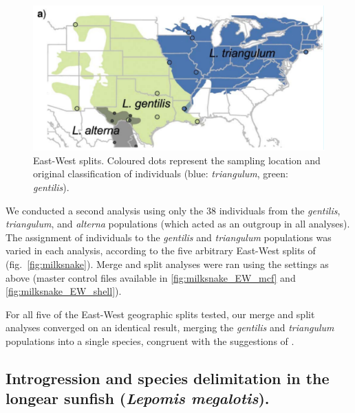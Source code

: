 \documentclass[A4]{article1}
\begin{document}
\begin{figure}
	\centering %
	\includegraphics[scale=0.5]{figs/miksnakes_EW} %
	
	\caption{East-West splits. Coloured dots represent the sampling location and original classification of
		individuals (blue: \textit{triangulum}, green: \textit{gentilis}). %
	} \label{fig:milksnake_EW}
\end{figure} 

We conducted a second analysis using only the 38 individuals from the \textit{gentilis},
\textit{triangulum}, and \textit{alterna} populations (which acted as an outgroup in all
analyses).  The assignment of individuals to the \textit{gentilis} and \textit{triangulum}
populations was varied in each analysis, according to the five arbitrary East-West splits of \cite{Chambers2020} (fig.~\ref{fig:milksnake}). 
Merge and split analyses were ran using the settings as above (master control files available in \ref{fig:milksnake_EW_mcf} and \ref{fig:milksnake_EW_shell}). 

For all five of the East-West geographic splits tested, our merge and split analyses converged on an identical result,
merging the \textit{gentilis} and \textit{triangulum} populations into a single species, congruent with the suggestions of \cite{Chambers2020}.



\subsection{Introgression and species delimitation in the longear sunfish (\textit{Lepomis megalotis}).}
\end{document}
